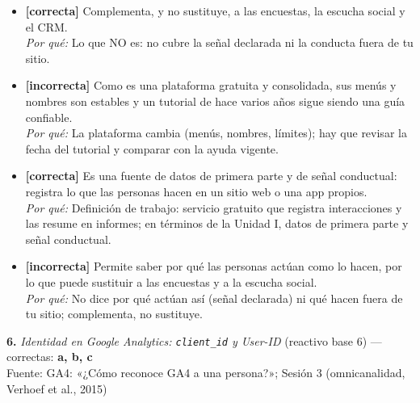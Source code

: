 \documentclass[10pt,letterpaper]{article}
\begin{document}
\begin{itemize}[leftmargin=1.2em,itemsep=0pt,topsep=1pt,parsep=0pt]
\item[\textbf{a)}] {\footnotesize \textbf{[correcta]} Complementa, y no sustituye, a las encuestas, la escucha social y el CRM.\\ \textit{Por qué:} Lo que NO es: no cubre la señal declarada ni la conducta fuera de tu sitio.}
\item[\textbf{b)}] {\footnotesize \textbf{[incorrecta]} Como es una plataforma gratuita y consolidada, sus menús y nombres son estables y un tutorial de hace varios años sigue siendo una guía confiable.\\ \textit{Por qué:} La plataforma cambia (menús, nombres, límites); hay que revisar la fecha del tutorial y comparar con la ayuda vigente.}
\item[\textbf{c)}] {\footnotesize \textbf{[correcta]} Es una fuente de datos de primera parte y de señal conductual: registra lo que las personas hacen en un sitio web o una app propios.\\ \textit{Por qué:} Definición de trabajo: servicio gratuito que registra interacciones y las resume en informes; en términos de la Unidad I, datos de primera parte y señal conductual.}
\item[\textbf{d)}] {\footnotesize \textbf{[incorrecta]} Permite saber por qué las personas actúan como lo hacen, por lo que puede sustituir a las encuestas y a la escucha social.\\ \textit{Por qué:} No dice por qué actúan así (señal declarada) ni qué hacen fuera de tu sitio; complementa, no sustituye.}
\end{itemize}
\vspace{3pt}\noindent\textbf{6.} \textit{Identidad en Google Analytics: \texttt{client\_id} y User-ID} (reactivo base 6) — correctas: \textbf{a, b, c}\\[-1pt]
{\scriptsize Fuente: GA4: «¿Cómo reconoce GA4 a una persona?»; Sesión 3 (omnicanalidad, Verhoef et al., 2015)}
\end{document}
